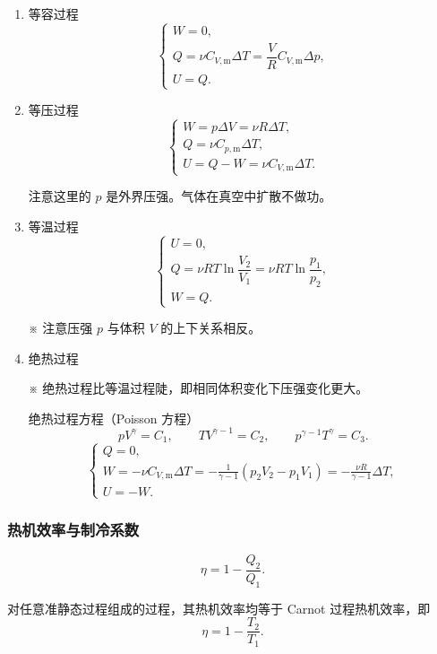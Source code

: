 \documentclass[UTF8,fontset=fandol,zihao=5]{ctexart}
\begin{document}
\begin{enumerate}
  \item 等容过程
  \[
    \begin{cases}
      W=0,\\
      Q=\nu C_{V,\mathrm m}\Delta T=\dfrac VR C_{V,\mathrm m}\Delta p,\\
      U=Q.
    \end{cases}
  \]

  \item 等压过程
  \[
    \begin{cases}
      W=p\Delta V=\nu R\Delta T,\\
      Q=\nu C_{p,\mathrm m}\Delta T,\\
      U=Q-W=\nu C_{V,\mathrm m}\Delta T.
    \end{cases}
  \]

  注意这里的 \(p\) 是外界压强。气体在真空中扩散不做功。

  \item 等温过程
  \[
    \begin{cases}
      U=0,\\
      Q=\nu RT\ln\dfrac{V_2}{V_1}=\nu RT\ln\dfrac{p_1}{p_2},\\
      W=Q.
    \end{cases}
  \]

  ※ 注意压强 \(p\) 与体积 \(V\) 的上下关系相反。

  \item 绝热过程

  ※ 绝热过程比等温过程陡，即相同体积变化下压强变化更大。

  绝热过程方程（Poisson 方程）
  \[
    pV^\gamma=C_1,
    \qquad
    TV^{\gamma-1}=C_2,
    \qquad
    p^{\gamma-1}T^\gamma=C_3.
  \]
  \[
    \begin{cases}
      Q=0,\\
      \displaystyle W=-\nu C_{V,\mathrm m}\Delta T
      =-\frac{1}{\gamma-1}(p_2V_2-p_1V_1)
      =-\frac{\nu R}{\gamma-1}\Delta T,\\[4pt]
      U=-W.
    \end{cases}
  \]
\end{enumerate}

\subsubsection{热机效率与制冷系数}

\[
  \eta=1-\frac{Q_2}{Q_1}.
\]

对任意准静态过程组成的过程，其热机效率均等于 Carnot 过程热机效率，即
\[
  \eta=1-\frac{T_2}{T_1}.
\]
\end{document}

